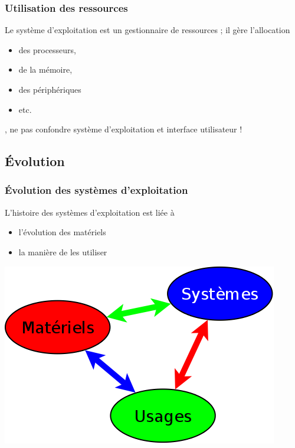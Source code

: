 \documentclass{beamer}
\begin{document}
\begin{frame}
  \frametitle{Utilisation des ressources} 
  
  Le système d'exploitation est un
  \alert{gestionnaire de ressources} ; il gère l'allocation 
  \begin{itemize}
  \item des
    processeurs, 
      \item de la mémoire,
	\item des périphériques 
	\item etc.
  \end{itemize}

  , ne pas confondre système d'exploitation et
  interface utilisateur !

\end{frame}


\subsection{Évolution}


\begin{frame}[containsverbatim]
\frametitle{Évolution des systèmes d'exploitation}
\begin{multicols}{2}
L'histoire des systèmes d'exploitation est liée
à 
\begin{itemize}
\item l'évolution des matériels
\item la manière de les utiliser
\end{itemize}

\includegraphics[width=0.9\linewidth]{Figures/materiels-systemes-usages.png}
\end{multicols}

\end{frame}
\end{document}
